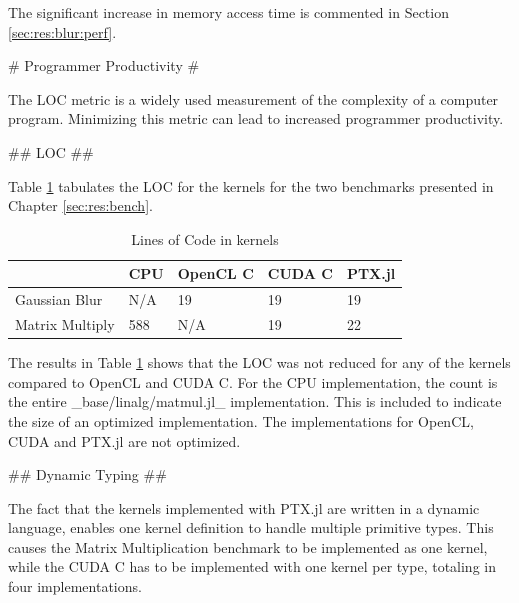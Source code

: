 \begin{markdown}
The significant increase in memory access time is commented in
Section \ref{sec:res:blur:perf}.

# Programmer Productivity #
\label{sec:res:productivity}

The \gls{LOC} metric is a widely used measurement of the complexity of
a computer program. Minimizing this metric can lead to increased
programmer productivity.

## LOC ##
\label{sec:res:loc}

Table \ref{tab:loc} tabulates the LOC for the kernels for the two
benchmarks presented in Chapter \ref{sec:res:bench}.

\begin{table}[H]
  \centering
  \begin{tabular}{|l|l|l|l|l|}
    \hline
    & \textbf{CPU} & \textbf{OpenCL C} & \textbf{CUDA C} & \textbf{PTX.jl} \\
    \hline
    Gaussian Blur   & N/A & 19       & 19     & 19 \\
    \hline
    Matrix Multiply & 588 & N/A      & 19     & 22 \\
    \hline
  \end{tabular}
  \caption{Lines of Code in kernels}
  \label{tab:loc}
\end{table}

The results in Table \ref{tab:loc} shows that the LOC was not reduced
for any of the kernels compared to OpenCL and CUDA C. For the CPU
implementation, the count is the entire _base/linalg/matmul.jl_
implementation. This is included to indicate the size of an optimized
implementation. The implementations for OpenCL, CUDA and PTX.jl are
not optimized.

## Dynamic Typing ##

The fact that the kernels implemented with PTX.jl are written in a
dynamic language, enables one kernel definition to handle multiple
primitive types. This causes the Matrix Multiplication benchmark to be
implemented as one kernel, while the CUDA C has to be implemented
with one kernel per type, totaling in four implementations.

\end{markdown}
